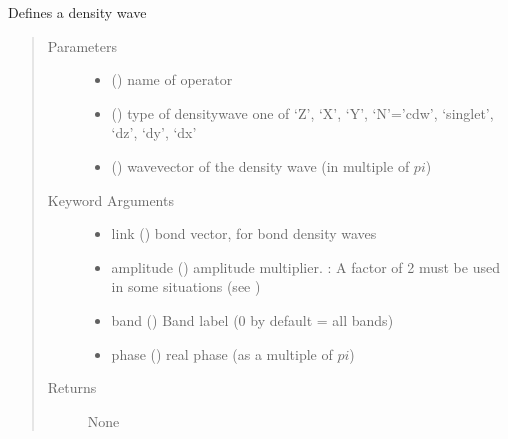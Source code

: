 \documentclass[letterpaper,10pt,english]{sphinxmanual}
\begin{document}
\begin{fulllineitems}
\label{\detokenize{functions:pyqcm.density_wave}}
\sphinxAtStartPar
Defines a density wave
\begin{quote}\begin{description}
\item[{Parameters}] \leavevmode\begin{itemize}
\item {} 
\sphinxAtStartPar
{} () \textendash{} name of operator

\item {} 
\sphinxAtStartPar
{} () \textendash{} type of density\sphinxhyphen{}wave \textendash{} one of ‘Z’, ‘X’, ‘Y’, ‘N’=’cdw’, ‘singlet’, ‘dz’, ‘dy’, ‘dx’

\item {} 
\sphinxAtStartPar
{} () \textendash{} wavevector of the density wave (in multiple of \(pi\))

\end{itemize}

\item[{Keyword Arguments}] \leavevmode\begin{itemize}
\item {} 
\sphinxAtStartPar
link (\sphinxstyleemphasis{{[}int{]}}) \textendash{} bond vector, for bond density waves

\item {} 
\sphinxAtStartPar
amplitude () \textendash{} amplitude multiplier. : A factor of 2 must be used in some situations (see {\hyperref[\detokenize{models:density-wave-theory}]{}})

\item {} 
\sphinxAtStartPar
band () \textendash{} Band label (0 by default = all bands)

\item {} 
\sphinxAtStartPar
phase () \textendash{} real phase (as a multiple of \(pi\))

\end{itemize}

\item[{Returns}] \leavevmode
\sphinxAtStartPar
None

\end{description}\end{quote}

\end{fulllineitems}
\end{document}
